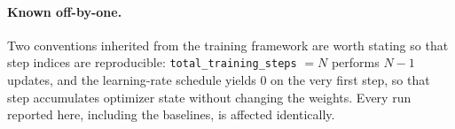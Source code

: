 \paragraph{Known off-by-one.}
Two conventions inherited from the training framework are worth stating so that step
indices are reproducible: \texttt{total\_training\_steps} $= N$ performs $N-1$ updates,
and the learning-rate schedule yields $0$ on the very first step, so that step
accumulates optimizer state without changing the weights. Every run reported here,
including the baselines, is affected identically.
